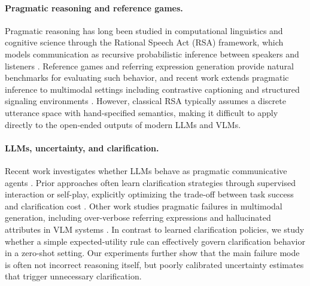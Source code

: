 \documentclass[11pt]{article}
\begin{document}
\paragraph{Pragmatic reasoning and reference games.}
Pragmatic reasoning has long been studied in computational linguistics and cognitive science through the Rational Speech Act (RSA) framework, which models communication as recursive probabilistic inference between speakers and listeners \citep{fried2017pragmatic, cohn2018pragmatically}. Reference games and referring expression generation provide natural benchmarks for evaluating such behavior, and recent work extends pragmatic inference to multimodal settings including contrastive captioning and structured signaling environments \citep{ou2023clip, carlsson2023structured}. However, classical RSA typically assumes a discrete utterance space with hand-specified semantics, making it difficult to apply directly to the open-ended outputs of modern LLMs and VLMs.

\paragraph{LLMs, uncertainty, and clarification.}
Recent work investigates whether LLMs behave as pragmatic communicative agents \citep{jian2024llmpragmatic, gul2024cogen}. Prior approaches often learn clarification strategies through supervised interaction or self-play, explicitly optimizing the trade-off between task success and clarification cost \citep{berant2025steerable}. Other work studies pragmatic failures in multimodal generation, including over-verbose referring expressions and hallucinated attributes in VLM systems \citep{ma2025vision}. In contrast to learned clarification policies, we study whether a simple expected-utility rule can effectively govern clarification behavior in a zero-shot setting. Our experiments further show that the main failure mode is often not incorrect reasoning itself, but poorly calibrated uncertainty estimates that trigger unnecessary clarification.


\end{document}
